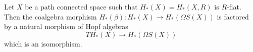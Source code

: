 Let $X$ be a path connected space such that $H_*(X) = H_*(X, R)$ is $R$-flat. Then the coalgebra morphism $H_*(\beta): H_*(X) \to H_*(\Omega S(X))$ is factored by a natural morphism of Hopf algebras
$$TH_*(X) \to H_*(\Omega S(X))$$
which is an isomorphism.
